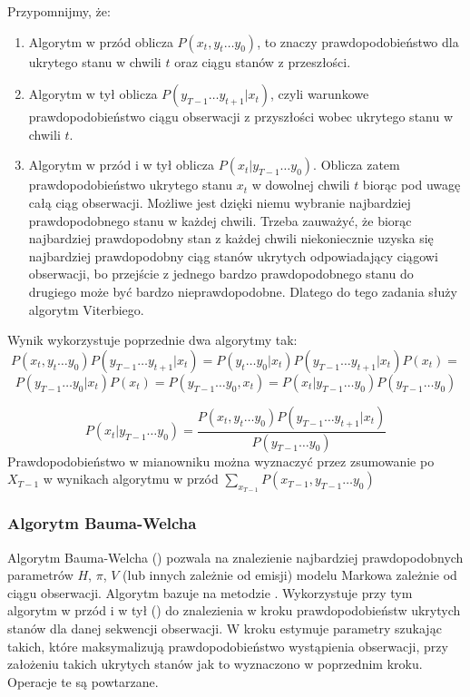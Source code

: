 Przypomnijmy, że:

\begin{enumerate}
    \item Algorytm w przód oblicza $P(x_t, y_t \dots y_0)$, to znaczy prawdopodobieństwo dla ukrytego stanu w chwili $t$ oraz ciągu stanów z przeszłości.
    \item Algorytm w tył oblicza $P(y_{T-1} \dots y_{t+1} | x_t)$, czyli warunkowe prawdopodobieństwo ciągu obserwacji z przyszłości wobec ukrytego stanu w chwili $t$.
    \item Algorytm w przód i w tył oblicza $P(x_t | y_{T-1} \dots y_0)$. Oblicza zatem prawdopodobieństwo ukrytego stanu $x_t$ w dowolnej chwili $t$ biorąc pod uwagę całą ciąg obserwacji. Możliwe jest dzięki niemu wybranie najbardziej prawdopodobnego stanu w każdej chwili. Trzeba zauważyć, że biorąc najbardziej prawdopodobny stan z każdej chwili niekoniecznie uzyska się najbardziej prawdopodobny ciąg stanów ukrytych odpowiadający ciągowi obserwacji, bo przejście z jednego bardzo prawdopodobnego stanu do drugiego może być bardzo nieprawdopodobne. Dlatego do tego zadania służy algorytm Viterbiego.
\end{enumerate}

Wynik  wykorzystuje poprzednie dwa algorytmy tak:
$$P(x_t, y_t \dots y_0) P(y_{T-1} \dots y_{t+1} | x_t) = P(y_t \dots y_0 | x_t) P(y_{T-1} \dots y_{t+1} | x_t) P(x_t) = $$
$$P(y_{T-1} \dots y_0 | x_t) P(x_t) = P(y_{T-1} \dots y_0, x_t) = P(x_t | y_{T-1} \dots y_0) P(y_{T-1} \dots y_0)$$

$$P(x_t | y_{T-1} \dots y_0) = \frac{P(x_t, y_t \dots y_0) P(y_{T-1} \dots y_{t+1} | x_t)}{P(y_{T-1} \dots y_0)}$$
Prawdopodobieństwo w mianowniku można wyznaczyć przez zsumowanie po $X_{T-1}$ w wynikach algorytmu w przód $\sum_{x_{T-1}} P(x_{T-1}, y_{T-1} \dots y_0)$

\subsubsection{Algorytm Bauma-Welcha}

Algorytm Bauma-Welcha () pozwala na znalezienie najbardziej prawdopodobnych parametrów
$H$, $\pi$, $V$ (lub innych zależnie od emisji) modelu Markowa zależnie od ciągu obserwacji. Algorytm bazuje na metodzie
. Wykorzystuje przy tym algorytm w przód i w tył ()
do znalezienia w kroku  prawdopodobieństw ukrytych stanów dla danej sekwencji obserwacji.
W kroku  estymuje parametry szukając takich, które maksymalizują prawdopodobieństwo wystąpienia
obserwacji, przy założeniu takich ukrytych stanów jak to wyznaczono w poprzednim kroku. Operacje te są powtarzane.

